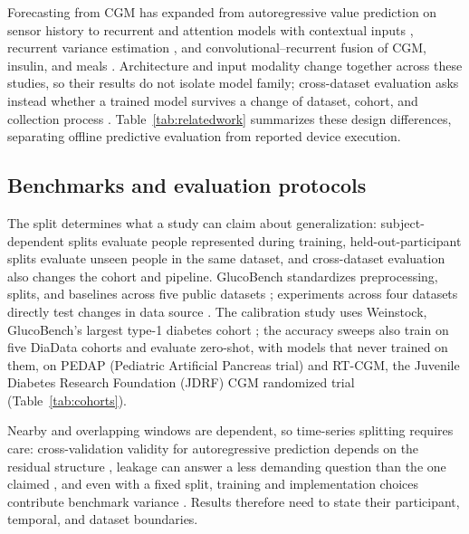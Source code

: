 \documentclass[10pt,twocolumn]{article}
\begin{document}
Forecasting from CGM has expanded from
autoregressive value prediction on sensor history
\cite{reifman2007predictive} to recurrent and attention models with
contextual inputs \cite{mirshekarian2019lstm}, recurrent variance estimation
\cite{martinsson2020variance}, and convolutional--recurrent fusion of CGM,
insulin, and meals \cite{li2020crnn}. Architecture and input modality change
together across these studies, so their results do not isolate model family;
cross-dataset evaluation asks instead whether a trained model survives a change
of dataset, cohort, and collection process \cite{ghimire2024generalize}.
Table~\ref{tab:relatedwork} summarizes these design differences, separating
offline predictive evaluation from reported device execution.

\subsection{Benchmarks and evaluation protocols}

The split determines what a study can claim about generalization:
subject-dependent splits evaluate people represented during training,
held-out-participant splits evaluate unseen people in the same dataset, and
cross-dataset evaluation also changes the cohort and pipeline. GlucoBench
standardizes preprocessing, splits, and baselines across five public datasets
\cite{sergazinov2024glucobench}; experiments across four datasets directly test
changes in data source \cite{ghimire2024generalize}. The calibration study
uses Weinstock, GlucoBench's largest type-1 diabetes cohort
\cite{weinstock2016risk}; the accuracy sweeps also train on five DiaData
cohorts \cite{cinar2026diadata} and evaluate zero-shot, with models that
never trained on them, on PEDAP (Pediatric Artificial Pancreas trial)
\cite{wadwa2023pedap} and RT-CGM, the Juvenile Diabetes Research
Foundation (JDRF) CGM randomized trial \cite{jdrf2008cgm}
(Table~\ref{tab:cohorts}).

Nearby and overlapping windows are dependent, so time-series splitting requires
care: cross-validation validity for autoregressive prediction depends on the
residual structure \cite{bergmeir2018crossvalidation}, leakage can answer a less
demanding question than the one claimed \cite{kapoor2023leakage}, and even with
a fixed split, training and implementation choices contribute benchmark
variance \cite{bouthillier2021variance}. Results therefore need to state
their participant, temporal, and dataset boundaries.
\end{document}
